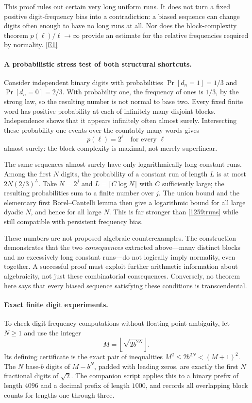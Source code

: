 \documentclass[11pt,a4paper]{article}
\newcommand{\eref}[2]{\hyperlink{extra:#1:#2}{[E#2]}}
\numberwithin{equation}{section}
\begin{document}
This proof rules out certain very long uniform runs.  It does not
turn a fixed positive digit-frequency bias into a contradiction:
a biased sequence can change digits often enough to have no long
runs at all.  Nor does the block-complexity theorem
$p(\ell)/\ell\to\infty$ provide an estimate for the relative
frequencies required by normality. \eref{1259}{1}

\paragraph{A probabilistic stress test of both structural shortcuts.}
Consider independent binary digits with probabilities
$\Pr[d_n=1]=1/3$ and $\Pr[d_n=0]=2/3$.  With probability one, the
frequency of ones is $1/3$, by the strong law, so the resulting number
is not normal to base two.  Every fixed finite word has positive
probability at each of infinitely many disjoint blocks.  Independence
shows that it appears infinitely often almost surely.  Intersecting
these probability-one events over the countably many words gives
\[
 p(\ell)=2^\ell\quad\text{for every }\ell
\]
almost surely: the block complexity is maximal, not merely superlinear.

The same sequences almost surely have only logarithmically long
constant runs.  Among the first $N$ digits, the probability of a
constant run of length $L$ is at most
$2N(2/3)^L$.  Take $N=2^j$ and $L=\lceil C\log N\rceil$ with
$C$ sufficiently large; the resulting probabilities sum to a finite
number over $j$.  The union bound and the elementary first
Borel--Cantelli lemma then give a logarithmic bound for all large
dyadic $N$, and hence for all large $N$.  This is far stronger than
\eqref{1259:runs} while still compatible with persistent frequency bias.

These numbers are not proposed algebraic counterexamples.  The
construction demonstrates that the two \emph{consequences} extracted
above---many distinct blocks and no excessively long constant
runs---do not logically imply normality, even together.  A successful
proof must exploit further arithmetic information about algebraicity,
not just these combinatorial consequences.  Conversely, no theorem
here says that every biased sequence satisfying these conditions is
transcendental.

\paragraph{Exact finite digit experiments.}
To check digit-frequency computations without floating-point ambiguity,
let $N\geq1$ and use the integer
\[
 M=\left\lfloor\sqrt{2b^{2N}}\right\rfloor.
\]
Its defining certificate is the exact pair of inequalities
$M^2\leq2b^{2N}<(M+1)^2$.  The $N$ base-$b$ digits of $M-b^N$,
padded with leading zeros, are exactly the first $N$ fractional digits
of $\sqrt2$.  The companion script applies this to a binary prefix
of length $4096$ and a decimal prefix of length $1000$, and records
all overlapping block counts for lengths one through three.
\end{document}
